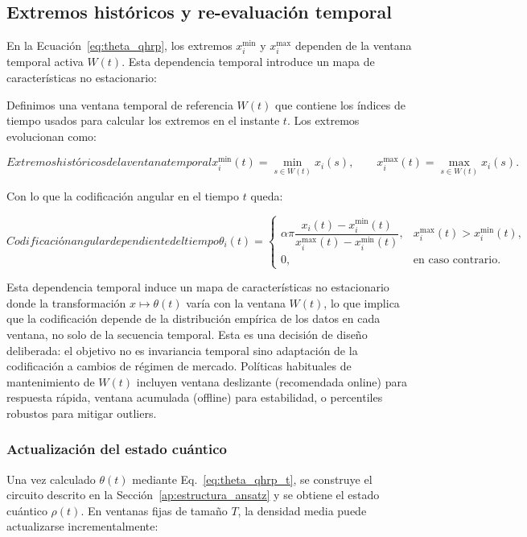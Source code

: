 \subsection[Extremos históricos y re-evaluación temporal]{Extremos históricos y re-evaluación temporal}
\label{ap:extremos_reevaluacion}

En la Ecuación~\eqref{eq:theta_qhrp}, los extremos $x_i^{\min}$ y $x_i^{\max}$ dependen de la ventana temporal activa $W(t)$. Esta dependencia temporal introduce un mapa de características no estacionario:

Definimos una ventana temporal de referencia $W(t)$ que contiene los índices de tiempo usados para calcular los extremos en el instante $t$. Los extremos evolucionan como:

\begin{equation}[eq:extremos_historiales]{Extremos históricos de la ventana temporal}
x_i^{\min}(t) = \min_{s\in W(t)} x_i(s),\qquad x_i^{\max}(t) = \max_{s\in W(t)} x_i(s).
\end{equation}

Con lo que la codificación angular en el tiempo $t$ queda:

\begin{equation}[eq:theta_qhrp_t]{Codificación angular dependiente del tiempo}
\theta_i(t)=\begin{cases}
\alpha\pi\dfrac{x_i(t)-x_i^{\min}(t)}{x_i^{\max}(t)-x_i^{\min}(t)}, & x_i^{\max}(t)>x_i^{\min}(t),\\
0, & \text{en caso contrario}.
\end{cases}
\end{equation}

Esta dependencia temporal induce un mapa de características no estacionario donde la transformación $x\mapsto\theta(t)$ varía con la ventana $W(t)$, lo que implica que la codificación depende de la distribución empírica de los datos en cada ventana, no solo de la secuencia temporal. Esta es una decisión de diseño deliberada: el objetivo no es invariancia temporal sino adaptación de la codificación a cambios de régimen de mercado. Políticas habituales de mantenimiento de $W(t)$ incluyen ventana deslizante (recomendada online) para respuesta rápida, ventana acumulada (offline) para estabilidad, o percentiles robustos para mitigar outliers.


\subsubsection{Actualización del estado cuántico}
Una vez calculado $\theta(t)$ mediante Eq.~\eqref{eq:theta_qhrp_t}, se construye el circuito descrito en la Sección~\ref{ap:estructura_ansatz} y se obtiene el estado cuántico $\rho(t)$. En ventanas fijas de tamaño $T$, la densidad media puede actualizarse incrementalmente:


